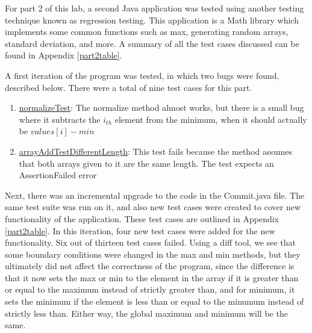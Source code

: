 For part 2 of this lab, a second Java application was tested using another
testing technique known as regression testing. This application is a Math
library which implements some common functions such as max, generating random
arrays, standard deviation, and more. A summary of all the test cases discussed
can be found in Appendix \ref{part2table}.

A first iteration of the program was tested, in which two bugs were found,
described below. There were a total of nine test cases for this part.

\begin{enumerate}
  \item \underline{normalizeTest}:
          The normalize method almost works, but there is a small bug where it
          subtracts the $i_{th}$ element from the minimum, when it should
          actually be $values[i] - min$
  \item \underline{arrayAddTestDifferentLength}:
          This test fails because the method assumes that both arrays given to
          it are the same length. The test expects an AssertionFailed error
\end{enumerate}

Next, there was an incremental upgrade to the code in the Commit.java file.  The
same test suite was run on it, and also new test cases were created to cover new
functionality of the application. These test cases are outlined in Appendix
\ref{part2table}. In this iteration, four new test cases were added for the new
functionality. Six out of thirteen test cases failed.  Using a diff tool, we see
that some boundary conditions were changed in the max and min methods, but they
ultimately did not affect the correctness of the program, since the difference
is that it now sets the max or min to the element in the array if it is greater
than or equal to the maximum instead of strictly greater than, and for minimum,
it sets the minimum if the element is less than or equal to the minumum instead
of strictly less than. Either way, the global maximum and minimum will be the
same. 

